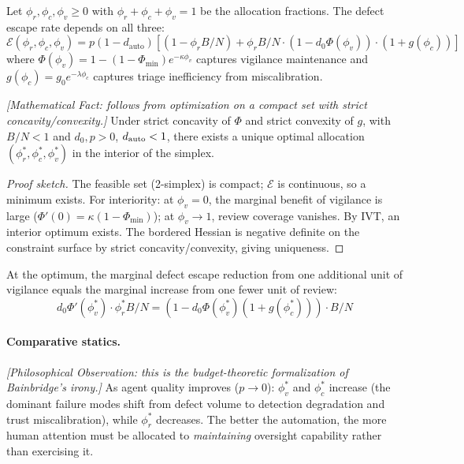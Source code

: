 Let $\phi_r, \phi_c, \phi_v \geq 0$ with $\phi_r + \phi_c + \phi_v = 1$ be the allocation fractions. The defect escape rate depends on all three:
\begin{equation}
\mathcal{E}(\phi_r, \phi_c, \phi_v) = p(1 - d_{\text{auto}}) \left[(1 - \phi_r B/N) + \phi_r B/N \cdot (1 - d_0 \Phi(\phi_v)) \cdot (1 + g(\phi_c))\right]
\end{equation}
where $\Phi(\phi_v) = 1 - (1 - \Phi_{\min}) e^{-\kappa \phi_v}$ captures vigilance maintenance and $g(\phi_c) = g_0 e^{-\lambda \phi_c}$ captures triage inefficiency from miscalibration.

\begin{theorem}
\emph{[Mathematical Fact: follows from optimization on a compact set with strict concavity/convexity.]}
\label{thm:budget-optimal}
Under strict concavity of $\Phi$ and strict convexity of $g$, with $B/N < 1$ and $d_0, p > 0$, $d_{\textup{auto}} < 1$, there exists a unique optimal allocation $(\phi_r^*, \phi_c^*, \phi_v^*)$ in the interior of the simplex.
\end{theorem}

\begin{proof}[Proof sketch]
The feasible set (2-simplex) is compact; $\mathcal{E}$ is continuous, so a minimum exists. For interiority: at $\phi_v = 0$, the marginal benefit of vigilance is large ($\Phi'(0) = \kappa(1 - \Phi_{\min})$); at $\phi_v \to 1$, review coverage vanishes. By IVT, an interior optimum exists. The bordered Hessian is negative definite on the constraint surface by strict concavity/convexity, giving uniqueness.
\end{proof}

\begin{corollary}
\label{cor:tradeoff}
At the optimum, the marginal defect escape reduction from one additional unit of vigilance equals the marginal increase from one fewer unit of review:
\begin{equation}
d_0 \Phi'(\phi_v^*) \cdot \phi_r^* B/N = (1 - d_0 \Phi(\phi_v^*)(1 + g(\phi_c^*))) \cdot B/N
\end{equation}
\end{corollary}

\paragraph{Comparative statics.} \emph{[Philosophical Observation: this is the budget-theoretic formalization of Bainbridge's irony.]} As agent quality improves ($p \to 0$): $\phi_v^*$ and $\phi_c^*$ increase (the dominant failure modes shift from defect volume to detection degradation and trust miscalibration), while $\phi_r^*$ decreases. The better the automation, the more human attention must be allocated to \emph{maintaining} oversight capability rather than exercising it.

